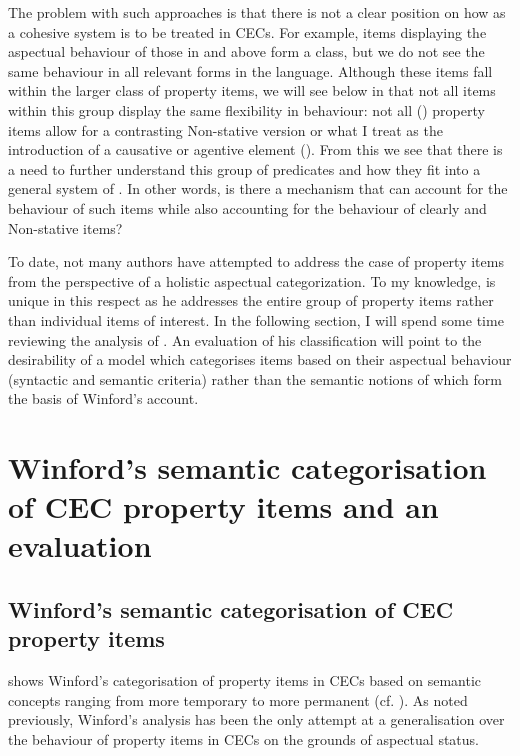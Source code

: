 The problem with such approaches is that there is not a clear position
on how  as a cohesive system is to be treated in CECs.  For
example, items displaying the aspectual behaviour of those in
 and  above form a class, but we do not see
the same behaviour in all relevant forms in the language.  Although
these items fall within the larger class of property items, we will
see below in  that not all items within this group
display the same flexibility in behaviour: not all () property
items allow for a contrasting Non-stative version or what I treat as
the introduction of a causative or agentive element (). 
From this we see that there is a need to further understand
this group of predicates and how they fit into a general system of
.  In other words, is there a mechanism that can account for the
behaviour of such items while also accounting for the behaviour of
clearly  and Non-stative items?

To date, not many authors have attempted to address the case of
property items from the perspective of a holistic aspectual
categorization.  To my knowledge, \citet{Winford1993} is unique in
this respect as he addresses the entire group of property items rather
than individual items of interest.  In the following section, I will
spend some time reviewing the analysis of \citet{Winford1993}.  An
evaluation of his classification will point to the desirability of a
model which categorises items based on their aspectual behaviour
(syntactic and semantic criteria) rather than the semantic notions of
\citet{Dixon1977} which form the basis of Winford’s account.
 
\section{Winford’s semantic categorisation of CEC property
  items and an evaluation}\label{sec:3.3}
  
\subsection{Winford’s semantic categorisation of CEC property  items}\label{sec:3.3.1}
  
 shows Winford’s categorisation of property items
in CECs based on semantic concepts ranging from more temporary to more
permanent (cf. \citealt{Dixon1977}).  As noted previously, Winford’s
analysis has been the only attempt at a generalisation over the
behaviour of property items in CECs on the grounds of aspectual
status.

